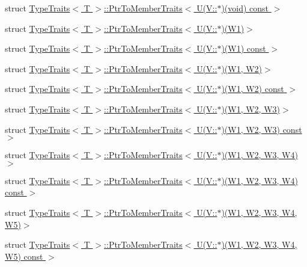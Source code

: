 \begin{DoxyCompactItemize}
\item 
struct \hyperlink{structTypeTraits_1_1PtrToMemberTraits_3_01U_07V_1_1_5_08_07void_08_01const_01_01_4}{Type\+Traits$<$ T $>$\+::\+Ptr\+To\+Member\+Traits$<$ U(\+V\+::$\ast$)(void) const  $>$}
\item 
struct \hyperlink{structTypeTraits_1_1PtrToMemberTraits_3_01U_07V_1_1_5_08_07W1_08_4}{Type\+Traits$<$ T $>$\+::\+Ptr\+To\+Member\+Traits$<$ U(\+V\+::$\ast$)(\+W1)$>$}
\item 
struct \hyperlink{structTypeTraits_1_1PtrToMemberTraits_3_01U_07V_1_1_5_08_07W1_08_01const_01_01_4}{Type\+Traits$<$ T $>$\+::\+Ptr\+To\+Member\+Traits$<$ U(\+V\+::$\ast$)(\+W1) const  $>$}
\item 
struct \hyperlink{structTypeTraits_1_1PtrToMemberTraits_3_01U_07V_1_1_5_08_07W1_00_01W2_08_4}{Type\+Traits$<$ T $>$\+::\+Ptr\+To\+Member\+Traits$<$ U(\+V\+::$\ast$)(\+W1, W2)$>$}
\item 
struct \hyperlink{structTypeTraits_1_1PtrToMemberTraits_3_01U_07V_1_1_5_08_07W1_00_01W2_08_01const_01_01_4}{Type\+Traits$<$ T $>$\+::\+Ptr\+To\+Member\+Traits$<$ U(\+V\+::$\ast$)(\+W1, W2) const  $>$}
\item 
struct \hyperlink{structTypeTraits_1_1PtrToMemberTraits_3_01U_07V_1_1_5_08_07W1_00_01W2_00_01W3_08_4}{Type\+Traits$<$ T $>$\+::\+Ptr\+To\+Member\+Traits$<$ U(\+V\+::$\ast$)(\+W1, W2, W3)$>$}
\item 
struct \hyperlink{structTypeTraits_1_1PtrToMemberTraits_3_01U_07V_1_1_5_08_07W1_00_01W2_00_01W3_08_01const_01_01_4}{Type\+Traits$<$ T $>$\+::\+Ptr\+To\+Member\+Traits$<$ U(\+V\+::$\ast$)(\+W1, W2, W3) const  $>$}
\item 
struct \hyperlink{structTypeTraits_1_1PtrToMemberTraits_3_01U_07V_1_1_5_08_07W1_00_01W2_00_01W3_00_01W4_08_4}{Type\+Traits$<$ T $>$\+::\+Ptr\+To\+Member\+Traits$<$ U(\+V\+::$\ast$)(\+W1, W2, W3, W4)$>$}
\item 
struct \hyperlink{structTypeTraits_1_1PtrToMemberTraits_3_01U_07V_1_1_5_08_07W1_00_01W2_00_01W3_00_01W4_08_01const_01_01_4}{Type\+Traits$<$ T $>$\+::\+Ptr\+To\+Member\+Traits$<$ U(\+V\+::$\ast$)(\+W1, W2, W3, W4) const  $>$}
\item 
struct \hyperlink{structTypeTraits_1_1PtrToMemberTraits_3_01U_07V_1_1_5_08_07W1_00_01W2_00_01W3_00_01W4_00_01W5_08_4}{Type\+Traits$<$ T $>$\+::\+Ptr\+To\+Member\+Traits$<$ U(\+V\+::$\ast$)(\+W1, W2, W3, W4, W5)$>$}
\item 
struct \hyperlink{structTypeTraits_1_1PtrToMemberTraits_3_01U_07V_1_1_5_08_07W1_00_01W2_00_01W3_00_01W4_00_01W5_08_01const_01_01_4}{Type\+Traits$<$ T $>$\+::\+Ptr\+To\+Member\+Traits$<$ U(\+V\+::$\ast$)(\+W1, W2, W3, W4, W5) const  $>$}

\end{DoxyCompactItemize}
